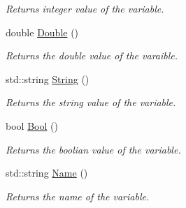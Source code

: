 \begin{DoxyCompactItemize}
\begin{DoxyCompactList}\small\item\em Returns integer value of the variable. \end{DoxyCompactList}\item 
double \hyperlink{structostendo_1_1Var_ae9a72f83d152e152dfa0054f05a5bd1a}{Double} ()\hypertarget{structostendo_1_1Var_ae9a72f83d152e152dfa0054f05a5bd1a}{}\label{structostendo_1_1Var_ae9a72f83d152e152dfa0054f05a5bd1a}

\begin{DoxyCompactList}\small\item\em Returns the double value of the varaible. \end{DoxyCompactList}\item 
std\+::string \hyperlink{structostendo_1_1Var_a0121e8cbc76819c9aec406a0352654ed}{String} ()\hypertarget{structostendo_1_1Var_a0121e8cbc76819c9aec406a0352654ed}{}\label{structostendo_1_1Var_a0121e8cbc76819c9aec406a0352654ed}

\begin{DoxyCompactList}\small\item\em Returns the string value of the variable. \end{DoxyCompactList}\item 
bool \hyperlink{structostendo_1_1Var_a0a7a7fb0f19d34d6e2b5da7eff8ed331}{Bool} ()\hypertarget{structostendo_1_1Var_a0a7a7fb0f19d34d6e2b5da7eff8ed331}{}\label{structostendo_1_1Var_a0a7a7fb0f19d34d6e2b5da7eff8ed331}

\begin{DoxyCompactList}\small\item\em Returns the boolian value of the variable. \end{DoxyCompactList}\item 
std\+::string \hyperlink{structostendo_1_1Var_a27b5e7f947ca4e37a827d8a4b6614a04}{Name} ()\hypertarget{structostendo_1_1Var_a27b5e7f947ca4e37a827d8a4b6614a04}{}\label{structostendo_1_1Var_a27b5e7f947ca4e37a827d8a4b6614a04}

\begin{DoxyCompactList}\small\item\em Returns the name of the variable. \end{DoxyCompactList}\end{DoxyCompactItemize}
